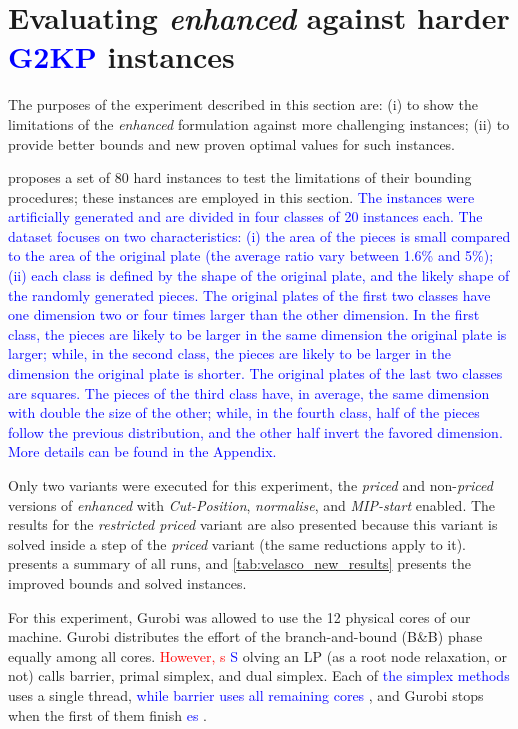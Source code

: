 \documentclass[ppgc,tese,english,formais,babel]{iiufrgs}
\newif\iffinalversion
\newcommand{\newtext}[1]{\iffinalversion%
#1%
\else%
\textcolor{blue}{#1}%
\fi%
}
\newcommand{\oldtext}[1]{\iffinalversion%
\else%
\textcolor{red}{#1}%
\fi%
}
\begin{document}
\section{Evaluating \emph{enhanced} against harder \newtext{G2KP} instances}
\label{sec:new_results}

The purposes of the experiment described in this section are:
(i) to show the limitations of the \emph{enhanced} formulation against more challenging instances;
(ii) to provide better bounds and new proven optimal values for such instances.

\citet{velasco:2019} proposes a set of 80 hard instances to test the limitations of their bounding procedures; these instances are employed in this section.
\newtext{The instances were artificially generated and are divided in four classes of 20 instances each. The dataset focuses on two characteristics: (i) the area of the pieces is small compared to the area of the original plate (the average ratio vary between 1.6\% and 5\%); (ii) each class is defined by the shape of the original plate, and the likely shape of the randomly generated pieces. The original plates of the first two classes have one dimension two or four times larger than the other dimension. In the first class, the pieces are likely to be larger in the same dimension the original plate is larger; while, in the second class, the pieces are likely to be larger in the dimension the original plate is shorter. The original plates of the last two classes are squares. The pieces of the third class have, in average, the same dimension with double the size of the other; while, in the fourth class, half of the pieces follow the previous distribution, and the other half invert the favored dimension. More details can be found in the Appendix.}

Only two variants were executed for this experiment, the \emph{priced} and non-\emph{priced} versions of \emph{enhanced} with \emph{Cut-Position}, \emph{normalise}, and \emph{MIP-start} enabled.
The results for the \emph{restricted priced} variant are also presented because this variant is solved inside a step of the \emph{priced} variant (the same reductions apply to it).
 presents a summary of all runs, and \cref{tab:velasco_new_results} presents the improved bounds and solved instances.

For this experiment, Gurobi was allowed to use the 12 physical cores of our machine.
Gurobi distributes the effort of the branch-and-bound (B\&B) phase equally among all cores.
\oldtext{However, s}\newtext{S}olving an LP (as a root node relaxation, or not) calls barrier, primal simplex, and dual simplex.
Each of \newtext{the simplex methods} uses a single thread, \newtext{while barrier uses all remaining cores}, and Gurobi stops when the first of them finish\newtext{es}.
\end{document}
